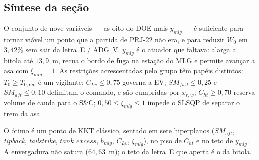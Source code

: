 \subsection{Síntese da seção}
\label{sec:p3sintese}

O conjunto de nove variáveis --- as oito do DOE mais $y_{mlg}$ --- é
suficiente para tornar viável um ponto que a partida de PRJ-22 não era,
e para reduzir $W_0$ em $3{,}42\%$ sem sair da letra~E / ADG~V. $y_{mlg}$
é o atuador que faltava: alarga a bitola até $13{,}9$~m, recua o bordo
de fuga na estação do MLG e permite avançar a asa com
$\xi_{mlg}=1$. As restrições acrescentadas pelo grupo têm papéis
distintos: $T_0\ge T_{0,\mathrm{req}}$ é um vigilante;
$C_{Lv}\le 0{,}75$ governa a EV; $SM_{fwd}\le 0{,}25$ e
$SM_{aft}\le 0{,}10$ delimitam o comando, e são cumpridas por $x_{r,w}$;
$C_{ht}\ge 0{,}70$ reserva volume de cauda para o S\&C;
$0{,}50\le\xi_{mlg}\le 1$ impede o SLSQP de separar o trem da asa.

O ótimo é um ponto de KKT clássico, sentado em sete hiperplanos
($SM_{aft}$, \emph{tipback}, \emph{tailstrike}, $tank\_excess$, $b_{mlg}$,
$C_{Lv}$, $\xi_{mlg}$), no piso de $C_{ht}$ e no teto de $y_{mlg}$. A
envergadura não satura ($64{,}63$~m); o teto da letra~E que aperta é o
da bitola.
